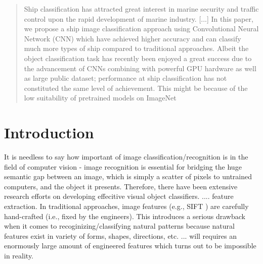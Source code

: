 \documentclass{sig-alternate}
\begin{document}
\maketitle
\begin{abstract}
Ship classification has attracted great interest in marine security and traffic control upon the rapid development of marine industry. [...] In this paper, we propose a ship image classification approach using Convolutional Neural Network (CNN) which have achieved higher accuracy and can classify much more types of ship compared to traditional approaches. Albeit the object classification task has recently been enjoyed a great success due to the advancement of CNNs combining with powerful GPU hardware as well as large public dataset; performance at ship classification has not constituted the same level of achievement. This might be because of the low suitability of pretrained models on ImageNet 
\end{abstract}




\section{Introduction}
It is needless to say how important of image classification/recognition is in the field of computer vision - image recognition is essential for bridging the huge semantic gap between an image, which is simply a scatter of pixels to untrained computers, and the object it presents. Therefore, there have been extensive research efforts on developing effecitive visual object classifiers. .... feature extraction. In traditional approaches, image features (e.g., SIFT \citep{Lowe:2004:DIF:993451.996342}) are carefully hand-crafted (i.e., fixed by the engineers). This introduces a serious drawback when it comes to recoginizing/classifying natural patterns because natural features exist in variety of forms, shapes, directions, etc. ... will requires an enormously large amount of engineered features which turns out to be impossible in reality. 
\end{document}
